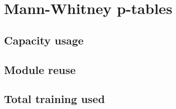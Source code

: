 \chapter{Mann-Whitney p-tables}

\section{Capacity usage}
\label{appendix:ptable.capacity}


\section{Module reuse}
\label{appendix:ptable.reuse}


\newpage
\section{Total training used}
\label{appendix:ptable.training}







